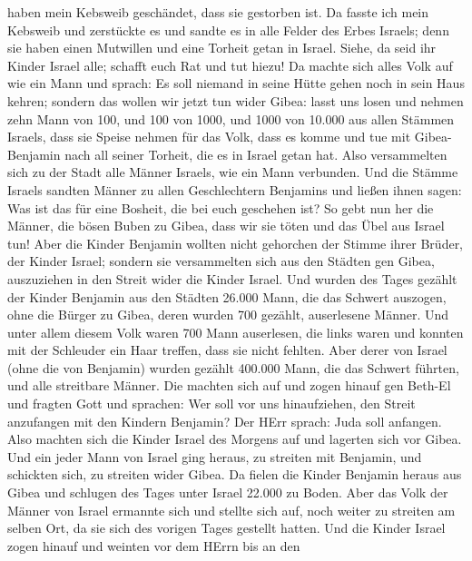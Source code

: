 haben mein Kebsweib geschändet, dass sie gestorben ist.  Da
fasste ich mein Kebsweib und zerstückte es und sandte es in alle Felder
des Erbes Israels; denn sie haben einen Mutwillen und eine Torheit getan
in Israel.  Siehe, da seid ihr Kinder Israel alle; schafft
euch Rat und tut hiezu!  Da machte sich alles Volk auf wie
ein Mann und sprach: Es soll niemand in seine Hütte gehen noch in sein
Haus kehren;  sondern das wollen wir jetzt tun wider Gibea:
 lasst uns losen und nehmen zehn Mann von 100, und 100 von
1000, und 1000 von 10.000 aus allen Stämmen Israels, dass sie Speise
nehmen für das Volk, dass es komme und tue mit Gibea-Benjamin nach all
seiner Torheit, die es in Israel getan hat.  Also
versammelten sich zu der Stadt alle Männer Israels, wie ein Mann
verbunden.  Und die Stämme Israels sandten Männer zu allen
Geschlechtern Benjamins und ließen ihnen sagen: Was ist das für eine
Bosheit, die bei euch geschehen ist?  So gebt nun her die
Männer, die bösen Buben zu Gibea, dass wir sie töten und das Übel aus
Israel tun! Aber die Kinder Benjamin wollten nicht gehorchen der Stimme
ihrer Brüder, der Kinder Israel;  sondern sie versammelten
sich aus den Städten gen Gibea, auszuziehen in den Streit wider die
Kinder Israel.  Und wurden des Tages gezählt der Kinder
Benjamin aus den Städten 26.000 Mann, die das Schwert auszogen, ohne die
Bürger zu Gibea, deren wurden 700 gezählt, auserlesene Männer.
 Und unter allem diesem Volk waren 700 Mann auserlesen, die
links waren und konnten mit der Schleuder ein Haar treffen, dass sie
nicht fehlten.  Aber derer von Israel (ohne die von
Benjamin) wurden gezählt 400.000 Mann, die das Schwert führten, und alle
streitbare Männer.  Die machten sich auf und zogen hinauf
gen Beth-El und fragten Gott und sprachen: Wer soll vor uns
hinaufziehen, den Streit anzufangen mit den Kindern Benjamin? Der HErr
sprach: Juda soll anfangen.  Also machten sich die Kinder
Israel des Morgens auf und lagerten sich vor Gibea.  Und
ein jeder Mann von Israel ging heraus, zu streiten mit Benjamin, und
schickten sich, zu streiten wider Gibea.  Da fielen die
Kinder Benjamin heraus aus Gibea und schlugen des Tages unter Israel
22.000 zu Boden.  Aber das Volk der Männer von Israel
ermannte sich und stellte sich auf, noch weiter zu streiten am selben
Ort, da sie sich des vorigen Tages gestellt hatten.  Und
die Kinder Israel zogen hinauf und weinten vor dem HErrn bis an den
